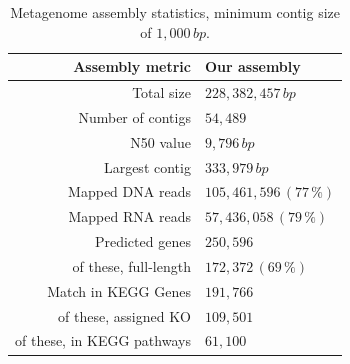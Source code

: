 \documentclass{bmcart}
\begin{document}
\begin{backmatter}
\begin{table}[h!]
\caption{Metagenome assembly statistics, minimum contig size of $1,000\,bp$.}
\begin{tabular}{rl}
\hline
Assembly metric & Our assembly\\
\hline
Total size & $228,382,457\,bp$\\
Number of contigs & $54,489$\\
N50 value & $9,796\,bp$\\
Largest contig & $333,979\,bp$\\
\hline
Mapped DNA reads & $105,461,596\,(77\,\%)$\\
Mapped RNA reads & $57,436,058\,(79\,\%)$\\
\hline
Predicted genes & $250,596$\\
of these, full-length & $172,372\,(69\,\%)$\\
Match in KEGG Genes & $191,766$\\
of these, assigned KO & $109,501$\\
of these, in KEGG pathways & $61,100$\\
\hline
\end{tabular}
\label{tAssembly}
\end{table}


%


\end{backmatter}
\end{document}

